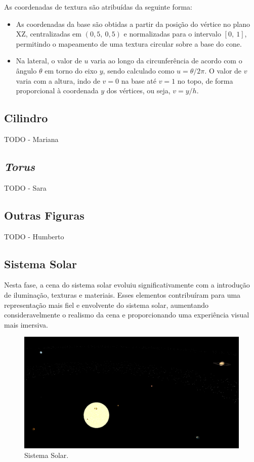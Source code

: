 \documentclass[12pt, a4paper]{article}
\begin{document}
As coordenadas de textura são atribuídas da seguinte forma:

\begin{itemize}
    \item As coordenadas da base são obtidas a partir da posição do vértice no plano XZ,
    centralizadas em $(0{,}5,\ 0{,}5)$ e normalizadas para o intervalo $[0,\ 1]$,
    permitindo o mapeamento de uma textura circular sobre a base do cone.
    \item Na lateral, o valor de $u$ varia ao longo da circunferência de acordo com o ângulo
    $\theta$ em torno do eixo $y$, sendo calculado como $u = \theta / 2\pi$. O valor de $v$
    varia com a altura, indo de $v = 0$ na base até $v = 1$ no topo, de forma proporcional à
    coordenada $y$ dos vértices, ou seja, $v = y/h$.
\end{itemize}

\subsection{Cilindro}

{\color{red} TODO - Mariana}

\subsection{\emph{Torus}}

{\color{red} TODO - Sara}

\subsection{Outras Figuras}

{\color{red} TODO - Humberto}

\subsection{Sistema Solar}

Nesta fase, a cena do sistema solar evoluiu significativamente com a introdução de iluminação,
texturas e materiais. Esses elementos contribuíram para uma representação mais fiel e
envolvente do sistema solar, aumentando consideravelmente o realismo da cena e proporcionando
uma experiência visual mais imersiva.

\begin{figure}[H]
    \centering
    \includegraphics[width=\textwidth]{res/phase4/SolarSystem.png}
    \caption{Sistema Solar.}
\end{figure}
\end{document}
